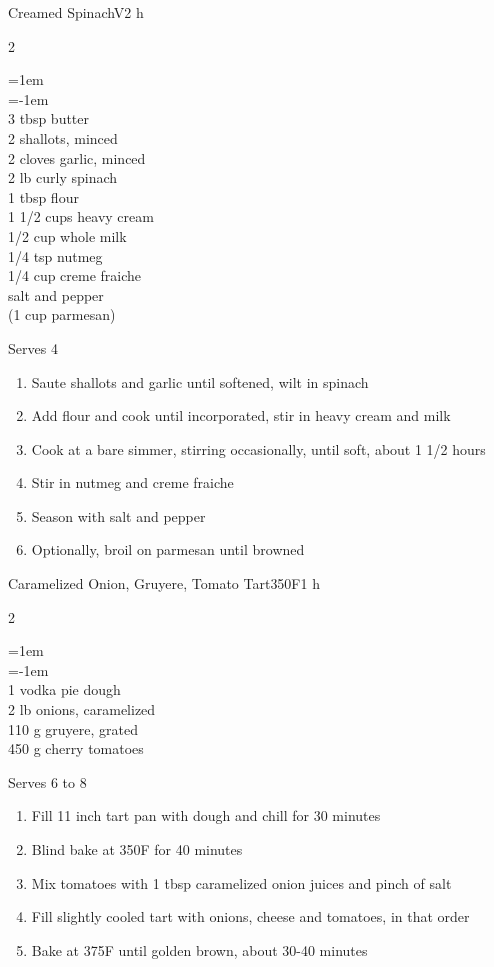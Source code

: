 \documentclass{article}
\newenvironment{recipe}[3][]
    {\begin{cardbase}[#1]{#2}{#3}
    \columnratio{0.333}
    \begin{paracol}{2}}
    {\end{paracol}\end{cardbase}}
\newcommand{\nextcolumn}{\switchcolumn}
\newenvironment{ingredients}
    {
    \begin{obeylines}
    \vspace{\parskip}
    \setlength{\parskip}{0.25em}
    \vspace{-0.25em}
    \leftskip=1em
    \parindent=-1em}
    {\end{obeylines}}
\newenvironment{steps}
    {\begin{enumerate}[leftmargin=*,topsep=0pt]}
    {\end{enumerate}}
\newcommand{\fahrenheit}[1]{#1\textdegree{}F}
\newcommand{\tag}[1]{\hspace{1em}#1}
\newcommand{\symboltag}[2]{\tag{#1\hspace{0.4em}#2}}
\newcommand{\totaltime}[1]{\symboltag{\raisebox{-0.1em}{\small\StopWatchEnd}}{#1}}
\newcommand{\preheat}[1]{\symboltag{\Topbottomheat}{#1}}
\begin{document}
\begin{recipe}{Creamed Spinach}{\tag{V}\totaltime{2 h}}
\begin{ingredients}
3 tbsp butter
2 shallots, minced
2 cloves garlic, minced
2 lb curly spinach
1 tbsp flour
1 1/2 cups heavy cream
1/2 cup whole milk
1/4 tsp nutmeg
1/4 cup creme fraiche
salt and pepper
(1 cup parmesan)
\end{ingredients}
\nextcolumn
Serves 4
\begin{steps}
    \item Saute shallots and garlic until softened, wilt in spinach
    \item Add flour and cook until incorporated, stir in heavy cream and milk
    \item Cook at a bare simmer, stirring occasionally, until soft, about 1 1/2 hours
    \item Stir in nutmeg and creme fraiche
    \item Season with salt and pepper
    \item Optionally, broil on parmesan until browned
\end{steps}
\end{recipe}

\begin{recipe}{Caramelized Onion, Gruyere, Tomato Tart}{\preheat{\fahrenheit{350}}\totaltime{1 h}}
\begin{ingredients}
1 vodka pie dough
2 lb onions, caramelized
110 g gruyere, grated
450 g cherry tomatoes
\end{ingredients}
\nextcolumn
Serves 6 to 8
\begin{steps}
    \item Fill 11 inch tart pan with dough and chill for 30 minutes
    \item Blind bake at \fahrenheit{350} for 40 minutes
    \item Mix tomatoes with 1 tbsp caramelized onion juices and pinch of salt
    \item Fill slightly cooled tart with onions, cheese and tomatoes, in that order
    \item Bake at \fahrenheit{375} until golden brown, about 30-40 minutes
\end{steps}
\end{recipe}
\end{document}
